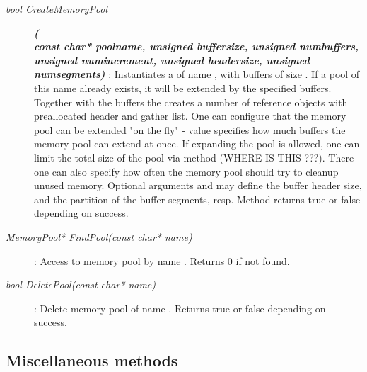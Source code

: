 \begin{description}	

\item[\em bool CreateMemoryPool] {\small \bf\em (} \\
{\small \bf\em const char* poolname, unsigned buffersize, unsigned numbuffers, \\
          unsigned numincrement, unsigned headersize, unsigned numsegments)} : 
Instantiates a  of name , 
with  buffers of size .
If a pool of this name already exists, it will be extended by the specified buffers.
Together with the buffers the  creates a number of reference objects with
preallocated header and gather list.
One can configure that the memory pool can be extended "on the fly" -
 value specifies how much buffers the memory pool can extend at once.
If expanding the pool is allowed, one can limit the total size 
of the pool via  method (WHERE IS THIS ???). 
There one can also specify how often
the memory pool should try to cleanup unused memory.
Optional arguments  and  may
define the buffer header size, and the partition of the buffer segments, resp.         
Method returns true or false depending on success.	

\item[\em MemoryPool* FindPool\small (const char* name)] :
Access to memory pool by name . Returns 0 if not found.

\item[\em bool DeletePool\small (const char* name)] :
Delete memory pool of name . Returns true or false depending on success.
   
\end{description}
	 

\subsection{Miscellaneous methods}
	 
